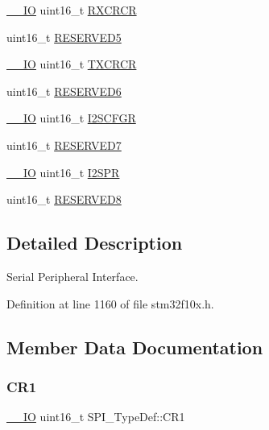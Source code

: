 \begin{DoxyCompactItemize}
\item 
\hyperlink{core__sc300_8h_aec43007d9998a0a0e01faede4133d6be}{\+\_\+\+\_\+\+IO} uint16\+\_\+t \hyperlink{struct_s_p_i___type_def_ab53da6fb851d911ae0b1166be2cfe48a}{R\+X\+C\+R\+CR}
\item 
uint16\+\_\+t \hyperlink{struct_s_p_i___type_def_ab63440e38c7872a8ed11fb2d8d94714e}{R\+E\+S\+E\+R\+V\+E\+D5}
\item 
\hyperlink{core__sc300_8h_aec43007d9998a0a0e01faede4133d6be}{\+\_\+\+\_\+\+IO} uint16\+\_\+t \hyperlink{struct_s_p_i___type_def_a3c0c1be66bc0a1846274a7511f4a36f5}{T\+X\+C\+R\+CR}
\item 
uint16\+\_\+t \hyperlink{struct_s_p_i___type_def_a0870177921541602a44f744f1b66e823}{R\+E\+S\+E\+R\+V\+E\+D6}
\item 
\hyperlink{core__sc300_8h_aec43007d9998a0a0e01faede4133d6be}{\+\_\+\+\_\+\+IO} uint16\+\_\+t \hyperlink{struct_s_p_i___type_def_a20a4775ce461eec0d9a437bed464c0a5}{I2\+S\+C\+F\+GR}
\item 
uint16\+\_\+t \hyperlink{struct_s_p_i___type_def_a98df0a538eb077b2cfc5194eda200f1b}{R\+E\+S\+E\+R\+V\+E\+D7}
\item 
\hyperlink{core__sc300_8h_aec43007d9998a0a0e01faede4133d6be}{\+\_\+\+\_\+\+IO} uint16\+\_\+t \hyperlink{struct_s_p_i___type_def_aecee11b0d2e534b5243e9db6a0e10026}{I2\+S\+PR}
\item 
uint16\+\_\+t \hyperlink{struct_s_p_i___type_def_a0ffe762827b71caff20c75bf105387f6}{R\+E\+S\+E\+R\+V\+E\+D8}
\end{DoxyCompactItemize}


\subsection{Detailed Description}
Serial Peripheral Interface. 

Definition at line 1160 of file stm32f10x.\+h.



\subsection{Member Data Documentation}
\mbox{\label{struct_s_p_i___type_def_a1e398155ddd013fcdd41309b4bd0bd5f}} 
\subsubsection{\texorpdfstring{C\+R1}{CR1}}
{\footnotesize\ttfamily \hyperlink{core__sc300_8h_aec43007d9998a0a0e01faede4133d6be}{\+\_\+\+\_\+\+IO} uint16\+\_\+t S\+P\+I\+\_\+\+Type\+Def\+::\+C\+R1}



